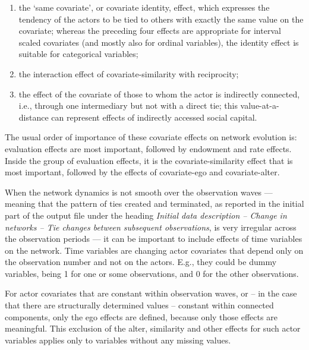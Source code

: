 \documentclass[a4paper,fleqn]{article}
\newcommand{\+}{\, + \,}
\begin{document}
{\begin{itemize}
\begin{enumerate}
      value;
      when used together with the alter effect of the squared variable
      this effect is quite analogous to the similarity effect,
      and for dichotomous covariates, in models where the ego and
      alter effects are also included, it even is equivalent
      to the similarity effect (although expressed differently),
      and then the squared alter effect is superfluous;
\item the `same covariate', or covariate identity, effect, which expresses the tendency of the
      actors to be tied to others with exactly the same value on the covariate;
      whereas the preceding four effects are appropriate for interval scaled
      covariates (and mostly also for ordinal variables),
      the identity effect is suitable for categorical variables;
\item the interaction effect of covariate-similarity with reciprocity;
\item the effect of the covariate of those to whom the actor is
      indirectly connected, i.e., through one intermediary but not
      with a direct tie; this value-at-a-distance can represent
      effects of indirectly accessed social capital.
\end{enumerate}
\end{itemize}
The usual order of importance of these covariate effects on
network evolution is: evaluation effects are most important, followed
by endowment and rate effects. Inside the group of evaluation
effects, it is the covariate-similarity effect that is most
important, followed by the effects of covariate-ego and
covariate-alter.

When the network dynamics is not smooth over the observation waves --- meaning that
the pattern of ties created and terminated, as reported in the initial part of the output
file under the heading \emph{Initial data description -- Change in networks --
Tie changes between subsequent observations},
is very irregular across the observation periods --- it can be important to include
effects of time variables on the network.
Time variables are changing actor covariates that depend only on the
observation number and not on the actors. E.g., they could be dummy variables, being 1
for one or some observations, and 0 for the other observations.

For actor covariates that are constant within observation waves,
or -- in the case that there are structurally determined values --
constant within connected components,
only the ego effects are defined, because only those
effects are meaningful.
This exclusion of the alter, similarity and other effects for
such actor variables applies only to variables without any missing values.

}
\end{document}
